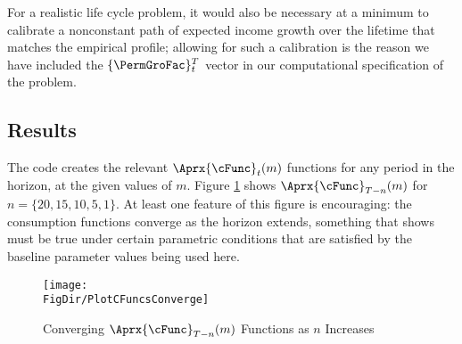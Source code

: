 For a realistic life cycle problem, it would also be necessary at a
minimum to calibrate a nonconstant path of expected income growth over the
lifetime that matches the empirical profile; allowing for such
a calibration is the reason we have included the $\{\PermGroFac\}_{t}^{T}$
vector in our computational specification of the problem.

\hypertarget{results}{}
\subsection{Results}

The code creates the relevant $\Aprx{\cFunc}_{t}(m)$ functions for any period in the horizon, at the given values of $m$.  Figure \ref{fig:PlotCFuncsConverge} shows $\Aprx{\cFunc}_{T-n}(m)$ for $n=\{20,15,10,5,1\}$.  At least one feature of this figure is encouraging: the consumption functions converge as the horizon extends, something that \cite{BufferStockTheory} shows must be true under certain parametric conditions that are satisfied by the baseline parameter values being used here.

\hypertarget{PlotCFuncsConverge}{}
\begin{figure}
  \texttt{[image: \\FigDir/PlotCFuncsConverge]}
  \caption{Converging $\Aprx{\cFunc}_{T-n}(m)$ Functions as $n$ Increases}
  \label{fig:PlotCFuncsConverge}
\end{figure}


